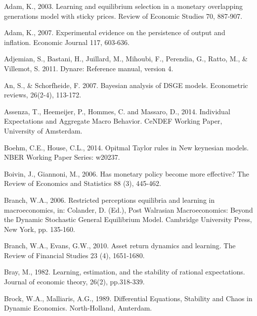\begin{thebibliography}{}

 Adam, K., 2003.
Learning and equilibrium selection in a monetary overlapping generations model with sticky prices.
{Review of Economic Studies} 70, 887-907.

 Adam, K., 2007. Experimental evidence on the persistence of output and inflation. Economic Journal 117, 603-636.

\bibitem{} Adjemian, S., Bastani, H., Juillard, M., Mihoubi, F., Perendia, G., Ratto, M., \& Villemot, S. 2011. Dynare: Reference manual, version 4.

\bibitem{} An, S., \& Schorfheide, F. 2007. Bayesian analysis of DSGE models. Econometric reviews, 26(2-4), 113-172.


Assenza, T., Heemeijer, P., Hommes, C. and Massaro, D., 2014.
Individual Expectations and Aggregate Macro Behavior. CeNDEF Working Paper, University of Amsterdam.

 Boehm, C.E., House, C.L., 2014. Opitmal Taylor rules in New keynesian models. NBER Working Paper Series: w20237.

 Boivin, J., Giannoni, M., 2006. Has monetary policy become more
effective? The Review of Economics and Statistics 88 (3), 445-462.

%
%
 Branch, W.A., 2006. Restricted perceptions equilibria and learning in macroeconomics, in: Colander, D.
(Ed.), Post Walrasian Macroeconomics: Beyond the Dynamic Stochastic
General Equilibrium Model. Cambridge University Press, New York, pp.
135-160.

\bibitem{} Branch, W.A., Evans, G.W., 2010. Asset return dynamics and learning. The Review of Financial Studies 23 (4), 1651-1680.

\bibitem{} Bray, M., 1982. Learning, estimation, and the stability of rational expectations. Journal of economic theory, 26(2), pp.318-339.

\bibitem{} Brock, W.A., Malliaris, A.G., 1989. Differential Equations, Stability and Chaos in Dynamic Economics. North-Holland, Amterdam.
%
%
%
%


\end{thebibliography}
